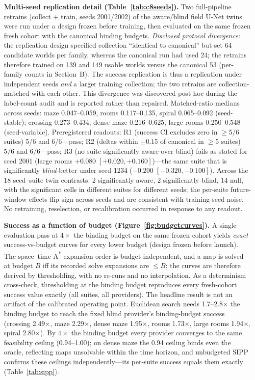 \documentclass[letterpaper]{article} %
\begin{document}
\textbf{Multi-seed replication detail (Table~\ref{tab:c8seeds}).} Two full-pipeline retrains (collect + train, seeds 2001/2002) of the aware/blind field U-Net twins were run under a design frozen before training, then evaluated on the same frozen fresh cohort with the canonical binding budgets. \emph{Disclosed protocol divergence:} the replication design specified collection ``identical to canonical'' but set 64 candidate worlds per family, whereas the canonical run had used 24; the retrains therefore trained on 139 and 149 usable worlds versus the canonical 53 (per-family counts in Section~B). The success replication is thus a replication under independent seeds \emph{and} a larger training collection; the two retrains are collection-matched with each other. This divergence was discovered post hoc during the label-count audit and is reported rather than repaired. Matched-ratio medians across seeds: maze 0.047--0.059, rooms 0.117--0.135, spiral 0.065--0.092 (seed-stable); crossing 0.273--0.434, dense maze 0.216--0.625, large rooms 0.250--0.548 (seed-variable). Preregistered readouts: R1 (success CI excludes zero in $\geq$5/6 suites) 5/6 and 6/6---pass; R2 (deltas within $\pm 0.15$ of canonical in $\geq$5 suites) 5/6 and 6/6---pass; R3 (no suite significantly aware-over-blind) fails as stated for seed 2001 (large rooms $+0.080$ $[+0.020,+0.160]$)---the same suite that is significantly \emph{blind}-better under seed 1234 ($-0.200$ $[-0.320,-0.100]$). Across the 18 seed--suite twin contrasts: 2 significantly aware, 2 significantly blind, 14 null, with the significant cells in different suites for different seeds; the per-suite future-window effects flip sign across seeds and are consistent with training-seed noise. No retraining, reselection, or recalibration occurred in response to any readout.

\textbf{Success as a function of budget (Figure~\ref{fig:budgetcurves}).} A single evaluation pass at $4\times$ the binding budget on the same frozen cohort yields \emph{exact} success-vs-budget curves for every lower budget (design frozen before launch). The space--time A\textsuperscript{*} expansion order is budget-independent, and a map is solved at budget $B$ iff its recorded solve expansions are $\leq B$; the curves are therefore derived by thresholding, with no re-runs and no interpolation. As a determinism cross-check, thresholding at the binding budget reproduces every fresh-cohort success value exactly (all suites, all providers). The headline result is not an artifact of the calibrated operating point. Euclidean search needs 1.7--2.8$\times$ the binding budget to reach the fixed blind provider's binding-budget success (crossing 2.49$\times$, maze 2.29$\times$, dense maze 1.95$\times$, rooms 1.73$\times$, large rooms 1.94$\times$, spiral 2.80$\times$). By $4\times$ the binding budget every provider converges to the same feasibility ceiling (0.94--1.00); on dense maze the 0.94 ceiling binds even the oracle, reflecting maps unsolvable within the time horizon, and unbudgeted SIPP confirms these ceilings independently---its per-suite success equals them exactly (Table~\ref{tab:sipp}).
\end{document}
